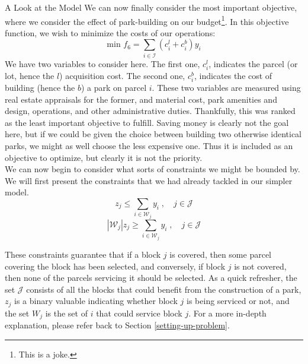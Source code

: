 \documentclass[12pt]{pom_thesis}
\theoremstyle{definition}
\begin{document}
\begin{chapter}{A Look at the Model}
We can now finally consider the most important objective, where we consider the effect of park-building on our budget\footnote{This is a joke.}. In this objective function, we wish to minimize the costs of our operations:
\begin{equation} \label{objective-6}
\textrm{min } f_6 = \sum_{i \in \mathcal{I}} (c_i^l + c_i^b)y_i
\end{equation}
We have two variables to consider here. The first one, $c_i^l$, indicates the parcel (or lot, hence the $l$) acquisition cost. The second one, $c_i^b$, indicates the cost of building (hence the $b$) a park on parcel $i$. These two variables are measured using real estate appraisals for the former, and material cost, park amenities and design, operations, and other administrative duties. Thankfully, this was ranked as the least important objective to fulfill. Saving money is clearly not the goal here, but if we could be given the choice between building two otherwise identical parks, we might as well choose the less expensive one. Thus it is included as an objective to optimize, but clearly it is not the priority. \\

We can now begin to consider what sorts of constraints we might be bounded by. We will first present the constraints that we had already tackled in our simpler model.
\begin{equation} \label{constraint-7}
z_j \leq \sum_{i \in \mathcal{W}_j} y_i \; , \quad j \in \mathcal{J}
\end{equation}
%
\begin{equation} \label{constrain-8}
\left|\mathcal{W}_j\right|z_j \geq \sum_{i \in \mathcal{W}_j} y_i \; , \quad j \in \mathcal{J}
\end{equation}

These constraints guarantee that if a block $j$ is covered, then some parcel covering the block has been selected, and conversely, if block $j$ is not covered, then none of the parcels servicing it should be selected. As a quick refresher, the set $\mathcal{J}$ consists of all the blocks that could benefit from the construction of a park, $z_j$ is a binary valuable indicating whether block $j$ is being serviced or not, and the set $W_j$ is the set of $i$ that could service block $j$. For a more in-depth explanation, please refer back to Section \ref{setting-up-problem}. \\


\end{chapter}
\end{document}
